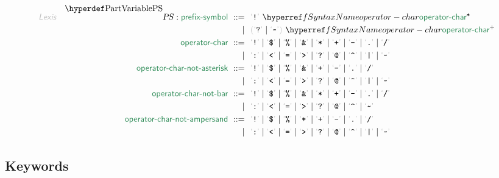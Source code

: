 \begin{align*}
  \KEY{Lexis} \quad
    \VARDECL{PS} : \SYN{prefix-symbol}
      \ ::= \ & \
      \LEX{{!}} \ \SYNREF{operator-char}\STAR \\
      \ \mid \ & \ \LEFTGROUP \LEX{{?}} \mid \LEX{{\TILDE}} \RIGHTGROUP \ \SYNREF{operator-char}\PLUS
    \\
     \SYN{operator-char}
      \ ::= \ & \
      \LEX{{!}} \mid \LEX{{\DOLLAR}} \mid \LEX{{\PERCENT}} \mid \LEX{{\AMPERSAND}} \mid \LEX{{*}} \mid \LEX{{+}} \mid \LEX{{-}} \mid \LEX{{.}} \mid \LEX{{/}} \\
      \ \mid \ & \ \LEX{{:}} \mid \LEX{{<}} \mid \LEX{{=}} \mid \LEX{{>}} \mid \LEX{{?}} \mid \LEX{{@}} \mid \LEX{{\CARET}} \mid \LEX{{|}} \mid \LEX{{\TILDE}}
    \\
     \SYN{operator-char-not-asterisk}
      \ ::= \ & \
      \LEX{{!}} \mid \LEX{{\DOLLAR}} \mid \LEX{{\PERCENT}} \mid \LEX{{\AMPERSAND}} \mid \LEX{{+}} \mid \LEX{{-}} \mid \LEX{{.}} \mid \LEX{{/}} \\
      \ \mid \ & \ \LEX{{:}} \mid \LEX{{<}} \mid \LEX{{=}} \mid \LEX{{>}} \mid \LEX{{?}} \mid \LEX{{@}} \mid \LEX{{\CARET}} \mid \LEX{{|}} \mid \LEX{{\TILDE}}
    \\
     \SYN{operator-char-not-bar}
      \ ::= \ & \
      \LEX{{!}} \mid \LEX{{\DOLLAR}} \mid \LEX{{\PERCENT}} \mid \LEX{{\AMPERSAND}} \mid \LEX{{*}} \mid \LEX{{+}} \mid \LEX{{-}} \mid \LEX{{.}} \mid \LEX{{/}} \\
      \ \mid \ & \ \LEX{{:}} \mid \LEX{{<}} \mid \LEX{{=}} \mid \LEX{{>}} \mid \LEX{{?}} \mid \LEX{{@}} \mid \LEX{{\CARET}} \mid \LEX{{\TILDE}}
    \\
     \SYN{operator-char-not-ampersand}
      \ ::= \ & \
      \LEX{{!}} \mid \LEX{{\DOLLAR}} \mid \LEX{{\PERCENT}} \mid \LEX{{*}} \mid \LEX{{+}} \mid \LEX{{-}} \mid \LEX{{.}} \mid \LEX{{/}} \\
      \ \mid \ & \ \LEX{{:}} \mid \LEX{{<}} \mid \LEX{{=}} \mid \LEX{{>}} \mid \LEX{{?}} \mid \LEX{{@}} \mid \LEX{{\CARET}} \mid \LEX{{|}} \mid \LEX{{\TILDE}}
\end{align*}
\subsection{Keywords}\hypertarget{keywords}{}\label{keywords}

